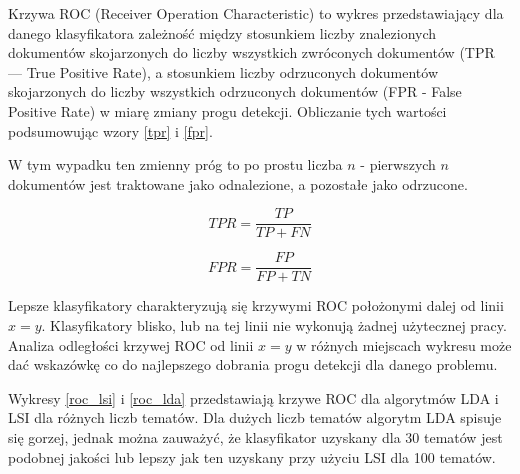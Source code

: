\documentclass[11pt,a4paper]{article}
\begin{document}
Krzywa ROC \cite{roc-article1} (Receiver Operation Characteristic) to wykres
przedstawiający dla danego klasyfikatora zależność między stosunkiem liczby
znalezionych dokumentów skojarzonych do liczby wszystkich zwróconych dokumentów
(TPR --- True Positive Rate), a stosunkiem liczby odrzuconych dokumentów
skojarzonych do liczby wszystkich odrzuconych dokumentów (FPR - False Positive
Rate) w miarę zmiany progu detekcji. Obliczanie tych wartości podsumowując
wzory \ref{tpr} i \ref{fpr}.

W tym wypadku ten zmienny próg to po prostu liczba $n$ - pierwszych $n$
dokumentów jest traktowane jako odnalezione, a pozostałe jako odrzucone.

\begin{equation}
\label{tpr}
TPR = \frac{TP}{TP + FN}
\end{equation}

\begin{equation}
\label{fpr}
FPR = \frac{FP}{FP + TN}
\end{equation}

Lepsze klasyfikatory charakteryzują się krzywymi ROC położonymi dalej od linii
$x = y$.  Klasyfikatory blisko, lub na tej linii nie wykonują żadnej użytecznej
pracy. Analiza odległości krzywej ROC od linii $x = y$ w różnych miejscach
wykresu może dać wskazówkę co do najlepszego dobrania progu detekcji dla danego
problemu.

Wykresy \ref{roc_lsi} i \ref{roc_lda} przedstawiają krzywe ROC dla algorytmów
LDA i LSI dla różnych liczb tematów. Dla dużych liczb tematów algorytm LDA
spisuje się gorzej, jednak można zauważyć, że klasyfikator uzyskany dla 30
tematów jest podobnej jakości lub lepszy jak ten uzyskany przy użyciu LSI dla
100 tematów.
\end{document}
